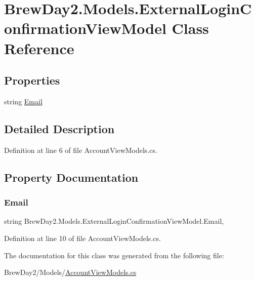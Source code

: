 \hypertarget{class_brew_day2_1_1_models_1_1_external_login_confirmation_view_model}{}\section{Brew\+Day2.\+Models.\+External\+Login\+Confirmation\+View\+Model Class Reference}
\label{class_brew_day2_1_1_models_1_1_external_login_confirmation_view_model}
\subsection*{Properties}
\begin{DoxyCompactItemize}
\item 
string \mbox{\hyperlink{class_brew_day2_1_1_models_1_1_external_login_confirmation_view_model_a655fcf7e5a8693dd0747871b57b17547}{Email}}
\end{DoxyCompactItemize}


\subsection{Detailed Description}


Definition at line 6 of file Account\+View\+Models.\+cs.



\subsection{Property Documentation}
\mbox{\label{class_brew_day2_1_1_models_1_1_external_login_confirmation_view_model_a655fcf7e5a8693dd0747871b57b17547}} 
\subsubsection{\texorpdfstring{Email}{Email}}
{\footnotesize\ttfamily string Brew\+Day2.\+Models.\+External\+Login\+Confirmation\+View\+Model.\+Email\hspace{0.3cm}{\ttfamily [get]}, {\ttfamily [set]}}



Definition at line 10 of file Account\+View\+Models.\+cs.



The documentation for this class was generated from the following file\+:\begin{DoxyCompactItemize}
\item 
Brew\+Day2/\+Models/\mbox{\hyperlink{_account_view_models_8cs}{Account\+View\+Models.\+cs}}\end{DoxyCompactItemize}
